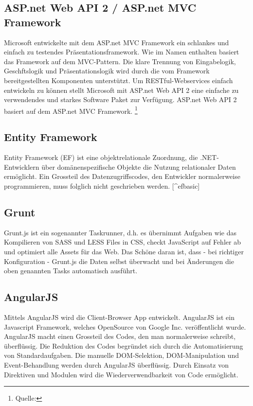 \subsection{ASP.net Web API 2 / ASP.net MVC
Framework}\label{asp.net-web-api-2-asp.net-mvc-framework}

Microsoft entwickelte mit dem ASP.net MVC Framework ein schlankes und
einfach zu testendes Präsentationsframework. Wie im Namen enthalten
basiert das Framework auf dem MVC-Pattern. Die klare Trennung von
Eingabelogik, Geschftslogik und Präsentationslogik wird durch die vom
Framework bereitgestellten Komponenten unterstützt. Um
RESTful-Webservices einfach entwickeln zu können stellt Microsoft mit
ASP.net Web API 2 eine einfache zu verwendendes und starkes Software
Paket zur Verfügung. ASP.net Web API 2 basiert auf dem ASP.net MVC
Framework. \footnote{Quelle:\autocite{csharpbasic}}

\newpage

\subsection{Entity Framework}\label{entity-framework}

Entity Framework (EF) ist eine objektrelationale Zuordnung, die
.NET-Entwicklern über domänenspezifische Objekte die Nutzung
relationaler Daten ermöglicht. Ein Grossteil des Datenzugriffscodes, den
Entwickler normalerweise programmieren, muss folglich nicht geschrieben
werden. {[}\^{}efbasic{]}

\subsection{Grunt}\label{grunt}

Grunt.js ist ein sogenannter Taskrunner, d.h. es übernimmt Aufgaben wie
das Kompilieren von SASS und LESS Files in CSS, checkt JavaScript auf
Fehler ab und optimiert alle Assets für das Web. Das Schöne daran ist,
dass - bei richtiger Konfiguration - Grunt.js die Daten selbst überwacht
und bei Änderungen die oben genannten Tasks automatisch ausführt.

\subsection{AngularJS}\label{angularjs}

Mittels AngularJS wird die Client-Browser App entwickelt. AngularJS ist
ein Javascript Framework, welches OpenSource von Google Inc.
veröffentlicht wurde. AngularJS macht einen Grossteil des Codes, den man
normalerweise schreibt, überflüssig. Die Reduktion des Codes begründet
sich durch die Automatisierung von Standardaufgaben. Die manuelle
DOM-Selektion, DOM-Manipulation und Event-Behandlung werden durch
AngularJS überflüssig. Durch Einsatz von Direktiven und Modulen wird die
Wiederverwendbarkeit von Code ermöglicht.

